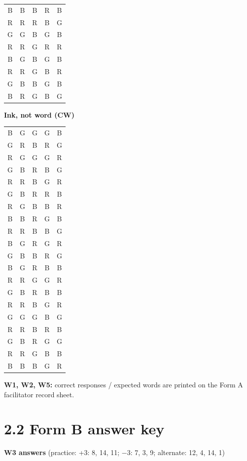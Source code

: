 \documentclass[10pt,a4paper]{article}
\begin{document}
\begin{minipage}[t]{0.3\linewidth}
\begin{tabular}{ccccc}
B & B & B & R & B\\
R & R & R & B & G\\
G & G & B & G & B\\
R & R & G & R & R\\
B & G & B & G & B\\
R & R & G & B & R\\
G & B & B & G & B\\
B & R & G & B & G\\\end{tabular}\end{minipage}\hfill\begin{minipage}[t]{0.3\linewidth}\centering\textbf{Ink, not word (CW)}\\[2pt]\ttfamily\footnotesize\begin{tabular}{ccccc}B & G & G & G & B\\
G & R & B & R & G\\
R & G & G & G & R\\
G & B & R & B & G\\
R & R & B & G & R\\
G & B & R & R & B\\
R & G & B & B & R\\
B & B & R & G & B\\
R & R & B & B & G\\
B & G & R & G & R\\
G & B & B & R & G\\
B & G & R & B & B\\
R & R & G & G & R\\
G & B & R & B & B\\
R & R & B & G & R\\
G & G & G & B & G\\
R & R & B & R & B\\
G & B & R & G & G\\
R & R & G & B & B\\
B & B & B & G & R\\\end{tabular}\end{minipage}\par\medskip
\textbf{W1, W2, W5:} correct responses / expected words are printed on the Form A facilitator record sheet.
\clearpage\section*{2.2 Form B answer key}
\textbf{W3 answers} (practice: +3: 8, 14, 11; $-$3: 7, 3, 9; alternate: 12, 4, 14, 1)\par
\end{document}
